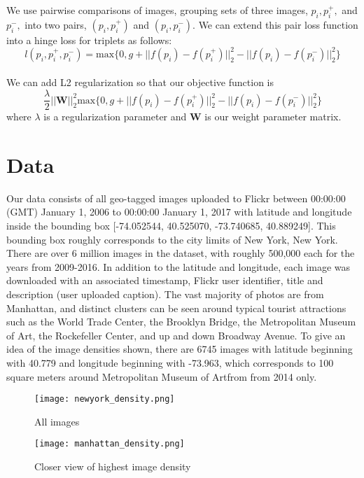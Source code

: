 \documentclass[pageno]{jpaper}
\begin{document}
We use pairwise comparisons of images, grouping sets of three images, $p_i, p_i^+,$ and $p_i^-,$ into two pairs, $(p_i, p_i^+)$ and $(p_i, p_i^-)$. We can extend this pair loss function into a hinge loss for triplets as follows\cite{wang2014learning}:
\begin{equation}
	l(p_i, p_i^+, p_i^-) = \text{max}\{0, g + ||f(p_i) - f(p_i^+)||_2^2 - ||f(p_i)-f(p_i^-)||_2^2\}
\end{equation}\\

We can add L2 regularization so that our objective function is
\begin{equation}
	\dfrac{\lambda}{2}||\mathbf{W}||_2^2 \text{max}\{0, g + ||f(p_i) - f(p_i^+)||_2^2 - ||f(p_i)-f(p_i^-)||_2^2\}
\end{equation}
where $\lambda$ is a regularization parameter and $\mathbf{W}$ is our weight parameter matrix.

\section{Data}
Our data consists of all geo-tagged images uploaded to Flickr between 00:00:00 (GMT) January 1, 2006 to 00:00:00 January 1, 2017 with latitude and longitude inside the bounding box [-74.052544, 40.525070, -73.740685, 40.889249]. This bounding box roughly corresponds to the city limits of New York, New York. There are over 6 million images in the dataset, with roughly 500,000 each for the years from 2009-2016. In addition to the latitude and longitude, each image was downloaded with an associated timestamp, Flickr user identifier, title and description (user uploaded caption). The vast majority of photos are from Manhattan, and distinct clusters can be seen around typical tourist attractions such as the World Trade Center, the Brooklyn Bridge, the Metropolitan Museum of Art, the Rockefeller Center, and up and down Broadway Avenue. To give an idea of the image densities shown, there are 6745 images with latitude beginning with 40.779 and longitude beginning with -73.963, which corresponds to 100 square meters around Metropolitan Museum of Artfrom from 2014 only.\\

\begin{figure}[!htbp]
  \label{densities}
  \centering
  \begin{minipage}[b]{0.4\textwidth}
  \texttt{[image: newyork\_density.png]}
  \caption{All images}
  \end{minipage}
  \hfill
  \begin{minipage}[!htbp]{0.4\textwidth}
  \texttt{[image: manhattan\_density.png]}
  \caption{Closer view of highest image density}
  \end{minipage}
\end{figure}
\end{document}
